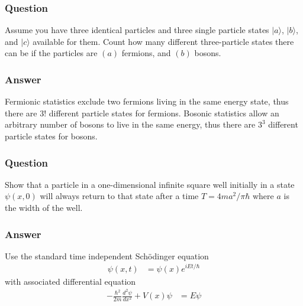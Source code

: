 \subsubsection{Question}

Assume you have three identical particles and three single particle states $|a\rangle$, $|b\rangle$, and $|c\rangle$ available for them. Count how many different three-particle states there can be if the particles are $(a)$ fermions, and $(b)$ bosons.

\subsubsection{Answer}
Fermionic statistics exclude two fermions living in the same energy state, thus there are $3!$ different particle states for fermions. Bosonic statistics allow an arbitrary number of bosons to live in the same energy, thus there are $3^3$ different particle states for bosons.

\subsubsection{Question}

Show that a particle in a one-dimensional infinite square well initially in a
state $\psi (x,0)$ will always return to that state after a time $T = 4ma^2/{\pi}{\hbar}$
where $a$ is the width of the well.

\subsubsection{Answer}
Use the standard time independent Sch\"odinger equation
\begin{align*}
	\psi (x,t) &= \psi (x) e^{iEt/{\hbar}}
\end{align*}
with associated differential equation
\begin{align*}
	-\frac{{\hbar}^2}{2m} \frac{d^2\psi }{dx^2} + V(x)\psi  &= E\psi 
\end{align*}

